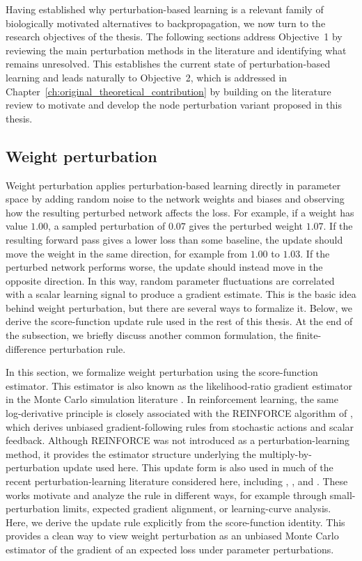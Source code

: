Having established why perturbation-based learning is a relevant family of biologically motivated alternatives to backpropagation, we now turn to the research objectives of the thesis. The following sections address Objective~1 by reviewing the main perturbation methods in the literature and identifying what remains unresolved. This establishes the current state of perturbation-based learning and leads naturally to Objective~2, which is addressed in Chapter~\ref{ch:original_theoretical_contribution} by building on the literature review to motivate and develop the node perturbation variant proposed in this thesis.

\subsection{Weight perturbation}
\label{sec:weight_perturbation}

Weight perturbation applies perturbation-based learning directly in parameter space by adding random noise to the network weights and biases and observing how the resulting perturbed network affects the loss. For example, if a weight has value \(1.00\), a sampled perturbation of \(0.07\) gives the perturbed weight \(1.07\). If the resulting forward pass gives a lower loss than some baseline, the update should move the weight in the same direction, for example from \(1.00\) to \(1.03\). If the perturbed network performs worse, the update should instead move in the opposite direction. In this way, random parameter fluctuations are correlated with a scalar learning signal to produce a gradient estimate. This is the basic idea behind weight perturbation, but there are several ways to formalize it. Below, we derive the score-function update rule used in the rest of this thesis. At the end of the subsection, we briefly discuss another common formulation, the finite-difference perturbation rule.

In this section, we formalize weight perturbation using the score-function estimator. This estimator is also known as the likelihood-ratio gradient estimator in the Monte Carlo simulation literature \parencite{glynn_likelihood_1995}. In reinforcement learning, the same log-derivative principle is closely associated with the REINFORCE algorithm of \textcite{williams_simple_1992}, which derives unbiased gradient-following rules from stochastic actions and scalar feedback. Although REINFORCE was not introduced as a perturbation-learning method, it provides the estimator structure underlying the multiply-by-perturbation update used here. This update form is also used in much of the recent perturbation-learning literature considered here, including \textcite{werfel_learning_2003}, \textcite{hiratani_stability_2022}, and \textcite{zuge_weight_2023}. These works motivate and analyze the rule in different ways, for example through small-perturbation limits, expected gradient alignment, or learning-curve analysis. Here, we derive the update rule explicitly from the score-function identity. This provides a clean way to view weight perturbation as an unbiased Monte Carlo estimator of the gradient of an expected loss under parameter perturbations.

